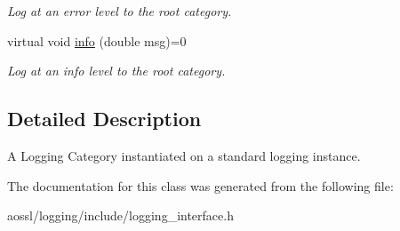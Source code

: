 \begin{DoxyCompactItemize}
\begin{DoxyCompactList}\small\item\em Log at an error level to the root category. \end{DoxyCompactList}\item 
virtual void \hyperlink{classLoggingCategoryInterface_aa99020d66ab28b686e060112b395b49f}{info} (double msg)=0\hypertarget{classLoggingCategoryInterface_aa99020d66ab28b686e060112b395b49f}{}\label{classLoggingCategoryInterface_aa99020d66ab28b686e060112b395b49f}

\begin{DoxyCompactList}\small\item\em Log at an info level to the root category. \end{DoxyCompactList}\end{DoxyCompactItemize}


\subsection{Detailed Description}
A Logging Category instantiated on a standard logging instance. 

The documentation for this class was generated from the following file\+:\begin{DoxyCompactItemize}
\item 
aossl/logging/include/logging\+\_\+interface.\+h\end{DoxyCompactItemize}
